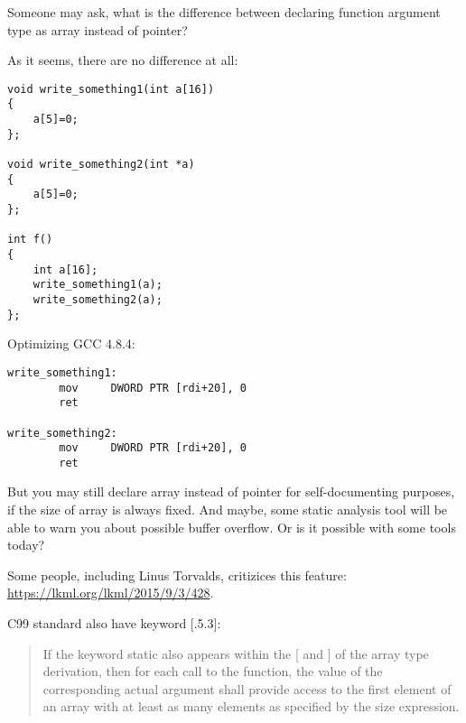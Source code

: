 
Someone may ask, what is the difference between declaring function argument type as array instead of pointer?

As it seems, there are no difference at all:

\begin{lstlisting}
void write_something1(int a[16])
{
	a[5]=0;
};

void write_something2(int *a)
{
	a[5]=0;
};

int f()
{
	int a[16];
	write_something1(a);
	write_something2(a);
};
\end{lstlisting}

Optimizing GCC 4.8.4:

\begin{lstlisting}
write_something1:
        mov     DWORD PTR [rdi+20], 0
        ret

write_something2:
        mov     DWORD PTR [rdi+20], 0
        ret
\end{lstlisting}

But you may still declare array instead of pointer for self-documenting purposes, if the size of array is always fixed.
And maybe, some static analysis tool will be able to warn you about possible buffer overflow.
Or is it possible with some tools today?

Some people, including Linus Torvalds, critizices this \CCpp feature: \url{https://lkml.org/lkml/2015/9/3/428}.

C99 standard also have  keyword [.5.3]:

\begin{framed}
\begin{quotation}
If the keyword static also appears  within the [ and ] of the array type derivation, then for each call to the function, the value of the corresponding actual argument shall provide access to the first element of an array with at least as many elements as specified by the size expression.
\end{quotation}
\end{framed}

